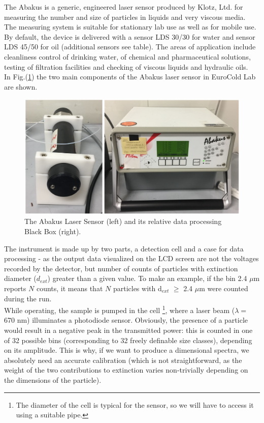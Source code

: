 \documentclass[a4paper, 11pt]{report}
\begin{document}
The Abakus is a generic, engineered laser sensor produced by Klotz, Ltd. for measuring the number and size of particles in liquids and very viscous media. The measuring system is suitable for stationary lab use as well as for mobile use.
 By default, the device is delivered with a sensor LDS 30/30 for water and sensor LDS 45/50 for oil (additional sensors see table). The areas of application include cleanliness control of drinking water, of chemical and pharmaceutical solutions, testing of filtration facilities and checking of viscous liquids and hydraulic oils. \\
In Fig.(\ref{abakus_img}) the two main components of the Abakus laser sensor in EuroCold Lab are shown.
\begin{figure}[!hp]
	\centering
	\includegraphics[scale=0.3]{abakus.png}
	\caption{The Abakus Laser Sensor (left) and its relative data processing Black Box (right).}
	\label{abakus_img}
\end{figure}
\newline
The instrument is made up by two parts, a detection cell and a case for data processing - as the output data visualized on the LCD screen are not the voltages recorded by the detector, but number of counts of particles with extinction diameter ($d_{ext}$) greater than a given value. To make an example, if the bin 2.4 $\mu$m reports $N$ counts, it means that $N$ particles with d$_{ext}$ $\geq$ 2.4 $\mu$m were counted during the run. \\
While operating, the sample is pumped in the cell \footnote{The diameter of the cell is typical for the sensor, so we will have to access it using a suitable pipe.}, where a laser beam ($\lambda =$ 670 nm) illuminates a photodiode sensor. Obviously, the presence of a particle would result in a negative peak in the transmitted power: this is counted in one of 32 possible bins (corresponding to 32 freely definable size classes), depending on its amplitude. This is why, if we want to produce a dimensional spectra, we absolutely need an accurate calibration (which is not straightforward, as the weight of the two contributions to extinction varies non-trivially depending on the dimensions of the particle). 
\end{document}
